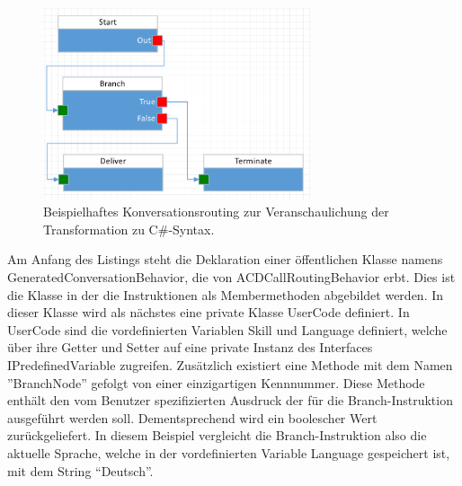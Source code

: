 \begin{figure} %
	\centering
		\includegraphics[width=0.7\textwidth]{img/FlowToCodeExample.png}
	\caption[Beispielhaftes Konversationsrouting zur Veranschaulichung der Transformation zu C\#-Syntax]{Beispielhaftes Konversationsrouting zur Veranschaulichung der Transformation zu C\#-Syntax.}
	\label{fig:FlowToCode}
\end{figure}
Am Anfang des Listings steht die Deklaration einer öffentlichen Klasse namens GeneratedConversationBehavior, die von ACDCallRoutingBehavior erbt. Dies ist die Klasse in der die Instruktionen als Membermethoden abgebildet werden. In dieser Klasse wird als nächstes eine private Klasse UserCode definiert. In UserCode sind die vordefinierten Variablen Skill und Language definiert, welche über ihre Getter und Setter auf eine private Instanz des Interfaces IPredefinedVariable zugreifen. Zusätzlich existiert eine Methode mit dem Namen ''BranchNode'' gefolgt von einer einzigartigen Kennnummer. Diese Methode enthält den vom Benutzer spezifizierten Ausdruck der für die Branch-Instruktion ausgeführt werden soll. Dementsprechend wird ein boolescher Wert zurückgeliefert. In diesem Beispiel vergleicht die Branch-Instruktion also die aktuelle Sprache, welche in der vordefinierten Variable Language gespeichert ist, mit dem String ``Deutsch''. 
\newline
